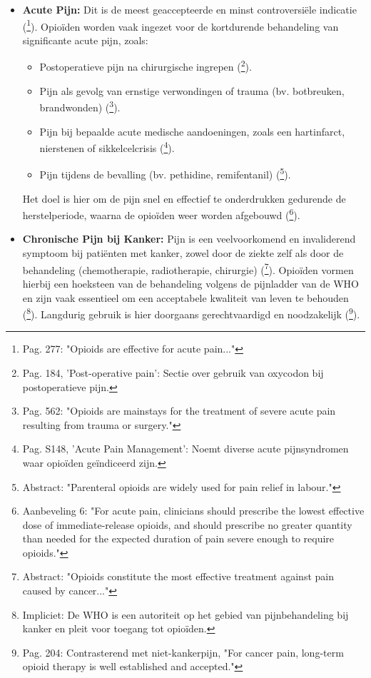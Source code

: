 \documentclass[11pt, a4paper]{report} %
\begin{document}
\begin{itemize}
    \item \textbf{Acute Pijn:} Dit is de meest geaccepteerde en minst controversiële indicatie (\cite{Chou2015OpioidsChronicPainNIH}\footnote{Pag. 277: "Opioids are effective for acute pain..."}). Opioïden worden vaak ingezet voor de kortdurende behandeling van significante acute pijn, zoals:
        \begin{itemize}
            \item Postoperatieve pijn na chirurgische ingrepen (\cite{Riley2008OxycodoneReview}\footnote{Pag. 184, 'Post-operative pain': Sectie over gebruik van oxycodon bij postoperatieve pijn.}).
            \item Pijn als gevolg van ernstige verwondingen of trauma (bv. botbreuken, brandwonden) (\cite{GutsteinAkil2006OpioidAnalgesics}\footnote{Pag. 562: "Opioids are mainstays for the treatment of severe acute pain resulting from trauma or surgery."}).
            \item Pijn bij bepaalde acute medische aandoeningen, zoals een hartinfarct, nierstenen of sikkelcelcrisis (\cite{Trescot2008OpioidPharm}\footnote{Pag. S148, 'Acute Pain Management': Noemt diverse acute pijnsyndromen waar opioïden geïndiceerd zijn.}).
            \item Pijn tijdens de bevalling (bv. pethidine, remifentanil) (\cite{Smith2018ParenteralOpioidsLabour}\footnote{Abstract: "Parenteral opioids are widely used for pain relief in labour."}).
        \end{itemize}
        Het doel is hier om de pijn snel en effectief te onderdrukken gedurende de herstelperiode, waarna de opioïden weer worden afgebouwd (\cite{Dowell2016CDCGuideline}\footnote{Aanbeveling 6: "For acute pain, clinicians should prescribe the lowest effective dose of immediate-release opioids, and should prescribe no greater quantity than needed for the expected duration of pain severe enough to require opioids."}).
    \item \textbf{Chronische Pijn bij Kanker:} Pijn is een veelvoorkomend en invaliderend symptoom bij patiënten met kanker, zowel door de ziekte zelf als door de behandeling (chemotherapie, radiotherapie, chirurgie) (\cite{Aguado2020OpioidsCancerKnowledgeMapping}\footnote{Abstract: "Opioids constitute the most effective treatment against pain caused by cancer..."}). Opioïden vormen hierbij een hoeksteen van de behandeling volgens de pijnladder van de WHO en zijn vaak essentieel om een acceptabele kwaliteit van leven te behouden (\cite{WHO2023Opioid}\footnote{Impliciet: De WHO is een autoriteit op het gebied van pijnbehandeling bij kanker en pleit voor toegang tot opioïden.}). Langdurig gebruik is hier doorgaans gerechtvaardigd en noodzakelijk (\cite{Portenoy1996OpioidTherapyChronicNonMalignantPain}\footnote{Pag. 204: Contrasterend met niet-kankerpijn, "For cancer pain, long-term opioid therapy is well established and accepted."}).

\end{itemize}
\end{document}
